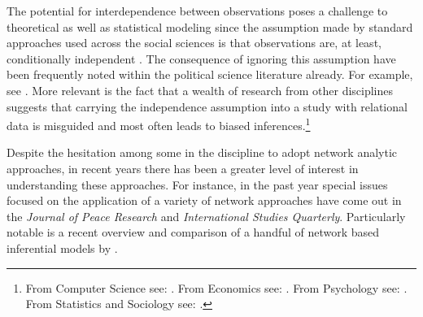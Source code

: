 
The potential for interdependence between observations poses a challenge to theoretical as well as statistical modeling since the assumption made by standard approaches used across the social sciences is that observations are, at least, conditionally independent \citep{snijders:2011}. The consequence of ignoring this assumption have been frequently noted within the political science literature already. For example, see \citet{beck:etal:1998,signorino:1999,hoff:ward:2004,franzese:hayes:2007,cranmer:desmarais:2011,erikson:pinto:2014}.  More relevant is the fact that a wealth of research from other disciplines suggests that carrying the independence assumption into a study with relational data is misguided and most often leads to biased inferences.\footnote{From Computer Science see: \citet{bonabeau:2002,brandes:erlebach:2005}. From Economics see: \citet{goyal:2012,jackson:2014}. From Psychology see: \citet{pattison:wasserman:1999,kenny:etal:2006}. From Statistics and Sociology see: \citet{snijders:1996,hoff:etal:2002}.} 


Despite the hesitation among some in the discipline to adopt network analytic approaches, in recent years there has been a greater level of interest in understanding these approaches. For instance, in the past year special issues focused on the application of a variety of network approaches have come out in the \textit{Journal of Peace Research} and \textit{International Studies Quarterly}. Particularly notable is a recent overview and comparison of a handful of network based inferential models by \citet{cranmer:etal:2016}.

